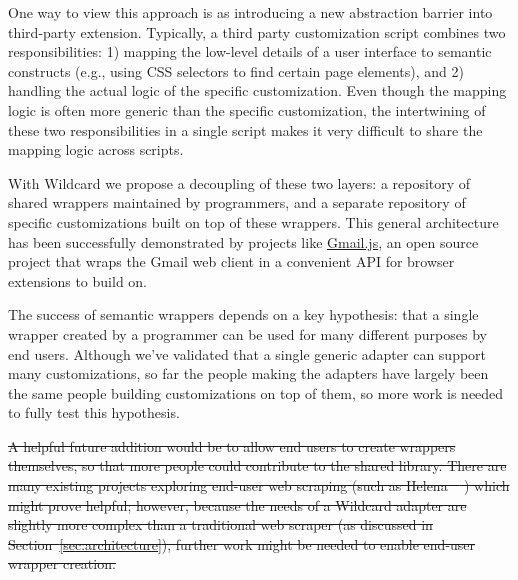 \documentclass[sigplan,screen,10pt,anonymous,review]{acmart}
\providecommand{\DIFdel}[1]{{\protect\color{red}\sout{#1}}}                      %
\providecommand{\DIFdelbegin}{} %
\begin{document}
One way to view this approach is as introducing a new abstraction
barrier into third-party extension. Typically, a third party
customization script combines two responsibilities: 1) mapping the
low-level details of a user interface to semantic constructs (e.g.,
using CSS selectors to find certain page elements), and 2) handling the
actual logic of the specific customization. Even though the mapping
logic is often more generic than the specific customization, the
intertwining of these two responsibilities in a single script makes it
very difficult to share the mapping logic across scripts.

With Wildcard we propose a decoupling of these two layers: a repository
of shared wrappers maintained by programmers, and a separate repository
of specific customizations built on top of these wrappers. This general
architecture has been successfully demonstrated by projects like
\href{https://github.com/KartikTalwar/gmail.js/}{Gmail.js}, an open
source project that wraps the Gmail web client in a convenient API for
browser extensions to build on.

The success of semantic wrappers depends on a key hypothesis: that a
single wrapper created by a programmer can be used for many different
purposes by end users. Although we've validated that a single generic
adapter can support many customizations, so far the people making the
adapters have largely been the same people building customizations on
top of them, so more work is needed to fully test this hypothesis.

\DIFdelbegin \DIFdel{A helpful future addition would be to allow end users to create wrappers
themselves, so that more people could contribute to the shared library.
There are many existing projects exploring end-user web scraping (such
as Helena \mbox{%
\citep{chasins2018}}\hspace{0pt}%
) which might prove helpful; however,
because the needs of a Wildcard adapter are slightly more complex than a
traditional web scraper (as discussed in
Section~\ref{sec:architecture}), further work might be needed to enable
end-user wrapper creation.
}%
\end{document}
